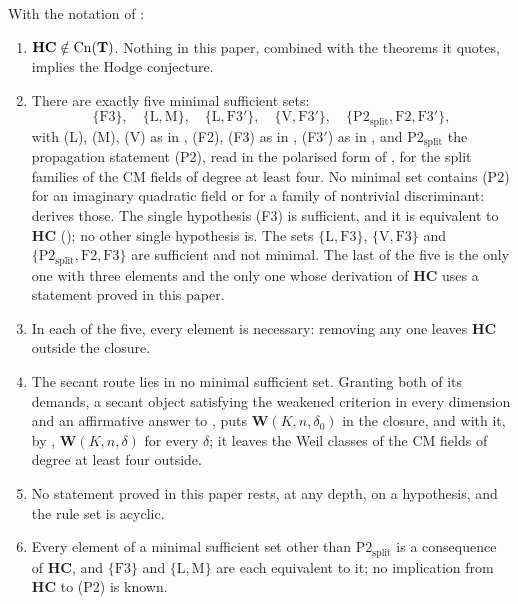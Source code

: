 \begin{theorem}\label{thm:closure}
With the notation of :
\begin{enumerate}[label=\textup{(\roman*)},leftmargin=2.6em]
\item $\mathbf{HC}\notin\mathrm{Cn}(\mathbf{T})$. Nothing in this paper, combined with the
  theorems it quotes, implies the Hodge conjecture.
\item There are exactly five minimal sufficient sets:
  \[
    \{\mathrm{F3}\},\quad\{\mathrm{L},\mathrm{M}\},\quad
    \{\mathrm{L},\mathrm{F3}'\},\quad\{\mathrm{V},\mathrm{F3}'\},\quad
    \{\mathrm{P2}_{\mathrm{split}},\mathrm{F2},\mathrm{F3}'\},
  \]
  with \textup{(L)}, \textup{(M)}, \textup{(V)} as in ,
  \textup{(F2)}, \textup{(F3)} as in , (F3$'$) as in
  , and $\mathrm{P2}_{\mathrm{split}}$ the propagation
  statement \textup{(P2)}, read in the polarised form of ,
  for the split families of the CM fields of degree at least four. No
  minimal set contains \textup{(P2)} for an imaginary quadratic field or for
  a family of nontrivial discriminant:  derives those.
  The single hypothesis (F3) is sufficient, and it is equivalent to
  $\mathbf{HC}$ (); no other single hypothesis is.
  The sets $\{\mathrm{L},\mathrm{F3}\}$, $\{\mathrm{V},\mathrm{F3}\}$ and
  $\{\mathrm{P2}_{\mathrm{split}},\mathrm{F2},\mathrm{F3}\}$ are sufficient and
  not minimal. The last of the five is the only one with three elements and the
  only one whose derivation of $\mathbf{HC}$ uses a statement proved in this
  paper.
\item In each of the five, every element is necessary: removing any one
  leaves $\mathbf{HC}$ outside the closure.
\item The secant route lies in no minimal sufficient set. Granting both of its
  demands, a secant object satisfying the weakened criterion in every
  dimension and an affirmative answer to \cite[Question 11.4]{Mar25b}, puts
  $\mathbf{W}(K,n,\delta_{0})$ in the closure, and with it, by
  , $\mathbf{W}(K,n,\delta)$ for every $\delta$; it leaves
  the Weil classes of the CM fields of degree at least four outside.
\item No statement proved in this paper rests, at any depth, on a
  hypothesis, and the rule set is acyclic.
\item Every element of a minimal sufficient set other than
  $\mathrm{P2}_{\mathrm{split}}$ is a consequence of $\mathbf{HC}$, and $\{\mathrm{F3}\}$ and
  $\{\mathrm{L},\mathrm{M}\}$ are each equivalent to it; no implication from
  $\mathbf{HC}$ to \textup{(P2)} is known.
\end{enumerate}
\end{theorem}

